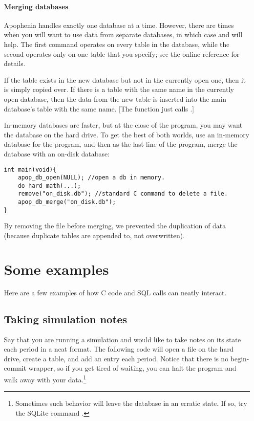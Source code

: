 \paragraph{Merging databases} Apophenia handles exactly one database at
a time. However, there are times when you will want to use data
from separate databases, in which case  and
 will help.  The first command
operates on every table in the database, while the second operates only
on one table that you specify; see the online reference for details.

If the table exists in the new database but not in the currently open
one, then it is simply copied over. If there is a table with the same
name in the currently open database, then the data from the new table is
inserted into the main database's table with the same name. [The function
just calls .]

In-memory databases are faster, but at the close of the program, you
may want the database on the hard drive. To get the best of both
worlds, use an in-memory database for the program, and then as the last
line of the program, merge the database with an on-disk database:
\begin{lstlisting}
int main(void){
    apop_db_open(NULL); //open a db in memory.
    do_hard_math(...);
    remove("on_disk.db"); //standard C command to delete a file.
    apop_db_merge("on_disk.db");
}
\end{lstlisting}
By removing the file before merging, we prevented the duplication of
data (because duplicate tables are appended to, not overwritten).

\section{Some examples} 
Here are a few examples of how C code and SQL calls can neatly interact.

\subsection{Taking simulation notes}\label{createeg}
Say that you are running a simulation and would like to take notes on
its state each period in a neat format. The following code will open a
file on the hard drive, create a table, and add an entry each period.
Notice that there is no begin-commit wrapper, so if you get tired of
waiting, you can halt the program and walk away with
your data.\footnote{Sometimes such behavior will leave the database in
an erratic state. If so, try the SQLite command .}

